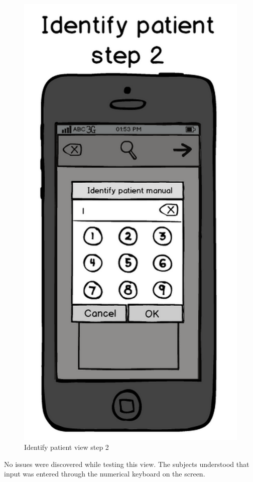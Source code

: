\begin{figure}[H]
\centering
\includegraphics[scale=0.20]{img/mockups/identify_patient_2.png}
\caption{Identify patient view step 2}
\label{identifymock2}
\end{figure}
No issues were discovered while testing this view. The subjects understood that input was entered through the numerical keyboard on the screen.

